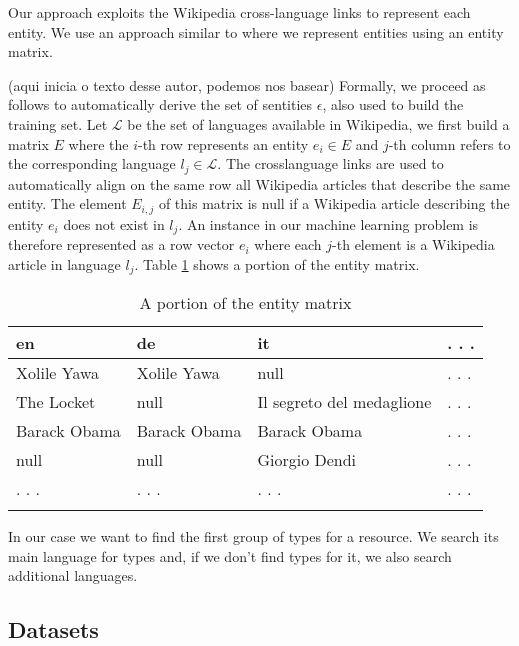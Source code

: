 \documentclass[10pt,a4paper]{llncs}
\begin{document}
Our approach exploits the Wikipedia cross-language links to represent each entity. We use an approach similar to \cite{aprosio} where we represent entities using an entity matrix. 

(aqui inicia o texto desse autor, podemos nos basear)
Formally, we proceed as follows to automatically derive the set of sentities $\epsilon$, also used to build the training set. Let $\mathcal{L}$ be the set of languages available in Wikipedia, we first build a matrix $E$ where the $i$-th row represents an entity $e_i \in E$ and $j$-th column refers to the corresponding language $l_j \in \mathcal{L}$. The crosslanguage links are used to automatically align on the same row all Wikipedia articles that describe the same entity. The element $E_{i,j}$ of this matrix is null if a Wikipedia article describing the entity $e_i$ does not exist in $l_j$. An instance in our machine learning problem is therefore represented as a row vector $e_i$ where each $j$-th element is a Wikipedia article in language $l_j$. Table \ref{tab:entityMatrix} shows a portion of the entity matrix.

\begin{table}
\centering
    \begin{tabular}{llll}
    en           & de           & it                        & . . .  \\ \hline
    Xolile Yawa  & Xolile Yawa  & null                      &  . . . \\
    The Locket   & null         & Il segreto del medaglione & . . .  \\
    Barack Obama & Barack Obama & Barack Obama              & . . .  \\
    null         & null         & Giorgio Dendi             & . . .  \\
    . . .        & . . .        & . . .                     & . . .  \\
    \vspace{0.2cm}
    \end{tabular}
    \caption{A portion of the entity matrix}
	  \label{tab:entityMatrix}
\end{table}

In our case we want to find the first group of types for a resource. We search its main language for types and, if we don't find types for it, we also search additional languages.

\subsection{Datasets}
\end{document}
